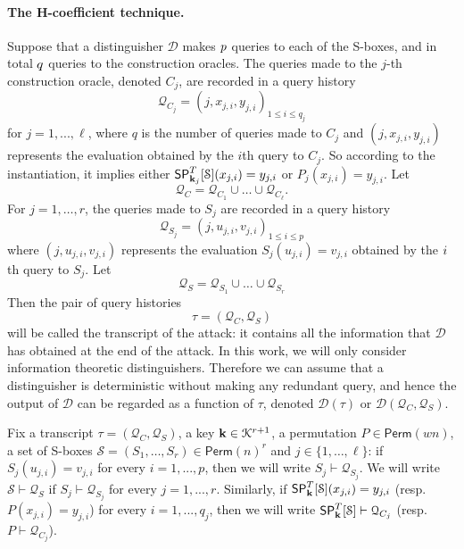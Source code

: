 
%

\paragraph{The H-coefficient technique.}

Suppose that a distinguisher $\mathcal{D}$ makes $\mathnormal{p}$ queries to each of the S-boxes, and in total $\mathnormal{q}$ queries to the construction oracles. The queries made to the $j$-th construction oracle, denoted $C_j$, are recorded in a query history
%
$$
\mathcal{Q}_{C_j} = (j,x_{j,i},y_{j,i})_{1 \leq i \leq q_j}
$$
%
for $j=1,...,\ell$, where $q$ is the number of queries made to $C_j$ and $(j,x_{j,i},y_{j,i})$ represents the evaluation obtained by the $i$th query to $C_j$. So according to the instantiation, it implies either $\mathsf{SP}_{\mathbf{k}_j}^T[\mathcal{S}](x_{j,i}) = y_{j,i}$  or ${P}_j(x_{j,i}) = y_{j,i}$. Let
%
$$\mathcal{Q}_{C}=\mathcal{Q}_{C_1}\cup\ldots\cup\mathcal{Q}_{C_\ell}.$$
%
For $j = 1,\ldots,r$, the queries made to $S_j$ are recorded in a query history
%
$$
\mathcal{Q}_{S_j} = (j, u_{j,i}, v_{j,i})_{1 \leq i \leq p}
$$
%
where $(j, u_{j,i}, v_{j,i})$  represents the evaluation $S_j(u_{j,i}) = v_{j,i}$ obtained by the $\mathnormal{i}$th query to $S_j$. Let
%
$$
\mathcal{Q}_{S}=\mathcal{Q}_{S_1} \cup \ldots \cup \mathcal{Q}_{S_r}
$$
%
Then the pair of query histories
%
$$
\tau = (\mathcal{Q}_{C}, \mathcal{Q}_{S})
$$
%
will be called the transcript of the attack: it contains all the information that $\mathcal{D}$ has obtained at the end of the attack. In this work, we will only consider
information theoretic distinguishers. Therefore we can assume that a distinguisher is deterministic without making any redundant query, and hence the output of  $\mathcal{D}$  can be regarded as a function of $\tau$, denoted $\mathcal{D}(\tau)$ or $\mathcal{D}(\mathcal{Q}_C, \mathcal{Q}_S)$.





Fix a transcript $\tau = (\mathcal{Q}_C,\mathcal{Q}_S)$, a key $\mathbf{k} \in \mathcal{K}^{r+1}$, a permutation ${P} \in {\mathsf{Perm}}(wn)$,  a set of S-boxes $\mathcal{S}=(S_1, \ldots  ,S_r) \in \mathsf{Perm}(n)^r $ and $j \in \{1, \ldots, \ell \}$: if $S_j(u_{j,i})=v_{j,i}$ for every $i = 1, . . . , p$, then we will write $S_j\vdash\mathcal{Q}_{S_j}$. We will write $\mathcal{S}\vdash\mathcal{Q}_S$ if $S_j\vdash\mathcal{Q}_{S_j}$ for every $j = 1, . . . , r$. Similarly, if
$\mathsf{SP}_{\mathbf{k}}^T[\mathcal{S}](x_{j,i}) = y_{j,i}$ (resp. ${P}(x_{j,i}) = y_{j,i}$) for every $i = 1, . . . , q_j$, then we will write $\mathsf{SP}_{\mathbf{k}}^T[\mathcal{S}]\vdash\mathcal{Q}_{C_j}$ (resp. ${P}\vdash\mathcal{Q}_{C_j}$).


